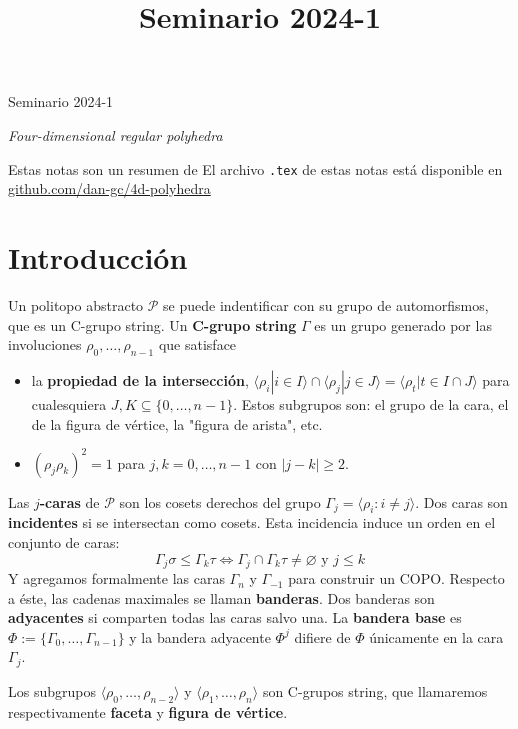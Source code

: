 \documentclass[spanish]{article}
\title{Seminario 2024-1}
\theoremstyle{definition}
\newcommand{\p}{\mathcal{P}}
\begin{document}
	\begin{center}
	{\LARGE Seminario 2024-1
		\vspace{.2cm}
		
		 \textit{Four-dimensional regular polyhedra}}
\end{center}
		\vspace{.2cm}
		
		Estas notas son un resumen de
\printbibliography[heading=none]
El archivo \texttt{.tex} de estas notas está disponible en \href{https://github.com/dan-gc/geo-riem/blob/main/geo-riem.pdf}{github.com/dan-gc/4d-polyhedra}

\tableofcontents


\section{Introducción}
Un politopo abstracto $\p$ se puede indentificar con su grupo de automorfismos, que es un C-grupo string.
Un \textbf{C-grupo string} $\Gamma$ es un grupo generado por las involuciones $\rho_0,\ldots,\rho_{n-1}$ que satisface
\begin{itemize}
	\item la \textbf{propiedad de la intersección},
	$\langle \rho_i|i\in I\rangle\cap\langle\rho_j|j\in J\rangle=\langle\rho_t|t\in I\cap J\rangle$ para cualesquiera $J,K\subseteq\{0,\ldots,n-1\}$. Estos subgrupos son: el grupo de la cara, el de la figura de vértice, la "figura de arista", etc.
	\item $(\rho_j\rho_k)^2=1$ para $j,k=0,\ldots,n-1$ con $|j-k|\geq2$.
\end{itemize}
Las $j$\textbf{-caras} de $\p$ son los cosets derechos del grupo $\Gamma_j=\langle \rho_i:i\neq j\rangle$. Dos caras son \textbf{incidentes} si se intersectan como cosets. Esta incidencia induce un orden en el conjunto de caras:
\[\Gamma_j\sigma\leq\Gamma_k\tau\iff\Gamma_j\cap\Gamma_k\tau\neq\varnothing\text{ y }j\leq k\]
Y agregamos formalmente las caras $\Gamma_n$ y $\Gamma_{-1}$ para construir un COPO. Respecto a éste, las cadenas maximales se llaman \textbf{banderas}. Dos banderas son \textbf{adyacentes} si comparten todas las caras salvo una. La \textbf{bandera base} es $\Phi:=\{\Gamma_0,\dots,\Gamma_{n-1}\}$ y la bandera adyacente $\Phi^j$ difiere de $\Phi$ únicamente en la cara $\Gamma_j$.

Los subgrupos $\langle\rho_0,\ldots,\rho_{n-2}\rangle$ y $\langle\rho_1,\ldots,\rho_n\rangle$ son C-grupos string, que llamaremos respectivamente \textbf{faceta} y \textbf{figura de vértice}.
\end{document}
